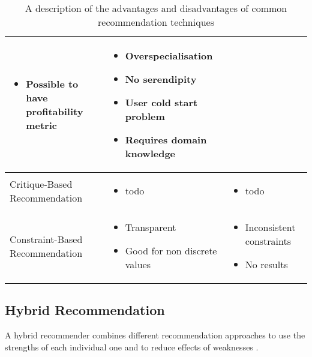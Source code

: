 \begin{table}
\begin{center}
\begin{tabularx}{\columnwidth}{X|X|X}
\begin{itemize}
                    \item Possible to have profitability metric
                \end{itemize}
            &   \begin{itemize}
                    \item Overspecialisation
                    \item No serendipity
                    \item User cold start problem
                    \item Requires domain knowledge
                \end{itemize} \\
            \hline
            Critique-Based Recommendation 
            &   \begin{itemize}
                    \item todo
                \end{itemize}
            &   \begin{itemize}
                    \item todo
                \end{itemize} \\ 
            \hline
            Constraint-Based Recommendation 
            &   \begin{itemize}
                    \item Transparent
                    \item Good for non discrete values
                \end{itemize}
            &   \begin{itemize}
                    \item Inconsistent constraints
                    \item No results
                \end{itemize} \\ 
        \end{tabularx}
        \caption{A description of the advantages and disadvantages of common recommendation techniques \cite{richthammerSituationAwarenessRecommender2018, shokeenStudyFeaturesSocial2019,hahslerRecommenderlabFrameworkDeveloping2015, aminiDiscoveringImpactKnowledge2011}}
        \label{tab:Foundations:RecommenderComparison}
    \end{center}
\end{table}

\subsection{Hybrid Recommendation}
A hybrid recommender combines different recommendation approaches to use the strengths of each individual one and to reduce effects of weaknesses \cite{burkeHybridRecommenderSystems2002}.

